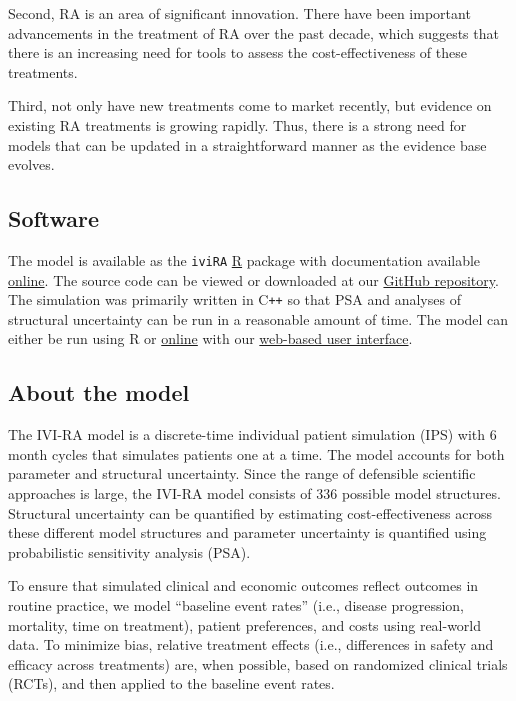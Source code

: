 \documentclass[11pt,final,fleqn]{article}\usepackage[]{graphicx}\usepackage[]{color}
\theoremstyle{plain}
\newcommand\CPP{{C\texttt{++}}}
\newcommand\R{{\textsf{R}}}
\newcommand{\code}[1]{\texttt{#1}}
\begin{document}
Second, RA is an area of significant innovation. There have been important advancements in the treatment of RA over the past decade, which suggests that there is an increasing need for tools to assess the cost-effectiveness of these treatments.

Third, not only have new treatments come to market recently, but evidence on existing RA treatments is growing rapidly. Thus, there is a strong need for models that can be updated in a straightforward manner as the evidence base evolves.

\subsection{Software}\label{sec:software}
The model is available as the \code{iviRA} \href{https://cran.r-project.org/}{\R{}} package with documentation available \href{https://innovationvalueinitiative.github.io/IVI-RA/index.html}{online}. The source code can be viewed or downloaded at our \href{https://github.com/InnovationValueInitiative/IVI-RA}{GitHub repository}. The simulation was primarily written in \CPP{} so that PSA and analyses of structural uncertainty can be run in a reasonable amount of time. The model can either be run using \R{} or \href{http://www.shinyapps.io/}{online} with our \href{https://innovationandvalueinitiative.shinyapps.io/ivi-ra/}{web-based user interface}.

\subsection{About the model}
The IVI-RA model is a discrete-time individual patient simulation (IPS) with 6 month cycles that simulates patients one at a time. The model accounts for both parameter and structural uncertainty. Since the range of defensible scientific approaches is large, the IVI-RA model consists of 336 possible model structures. Structural uncertainty can be quantified by estimating cost-effectiveness across these different model structures and parameter uncertainty is quantified using probabilistic sensitivity analysis (PSA). 

To ensure that simulated clinical and economic outcomes reflect outcomes in routine practice, we model ``baseline event rates'' (i.e., disease progression, mortality, time on treatment), patient preferences, and costs using real-world data. To minimize bias, relative treatment effects (i.e., differences in safety and efficacy across treatments) are, when possible, based on randomized clinical trials (RCTs), and then applied to the baseline event rates.
\end{document}
